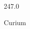 \documentclass[12pt]{article}
\begin{document}
\hfill{}
\vfill
\begin{center}
  {\fontsize{50}{60}
  }

  247.0

Curium
\end{center}
\vfill
\end{document}
